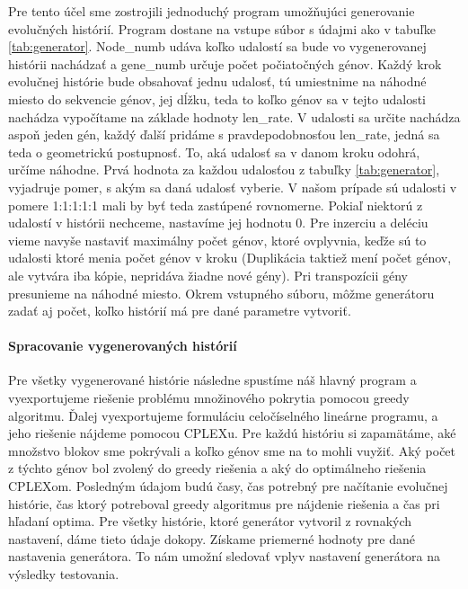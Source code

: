Pre tento účel sme zostrojili jednoduchý program umožňujúci generovanie evolučných histórií.
Program dostane na vstupe súbor s údajmi ako v tabuľke \ref{tab:generator}.
Node\_numb udáva koľko udalostí sa bude vo vygenerovanej histórii nachádzať
a gene\_numb určuje počet počiatočných génov. Každý krok evolučnej histórie bude obsahovať jednu udalosť, 
tú umiestnime na náhodné miesto do sekvencie génov,
jej dĺžku, teda to koľko génov sa v tejto udalosti nachádza vypočítame na základe hodnoty len\_rate.
V udalosti sa určite nachádza aspoň jeden gén, každý ďalší pridáme s pravdepodobnosťou len\_rate, jedná sa teda o geometrickú postupnosť.
To, aká udalosť sa v danom kroku odohrá, určíme náhodne. Prvá hodnota za každou udalosťou z tabuľky \ref{tab:generator}, 
vyjadruje pomer, s akým sa daná udalosť vyberie. V našom prípade sú udalosti v pomere 1:1:1:1:1 mali by byť teda zastúpené rovnomerne.
Pokiaľ niektorú z udalostí v histórii nechceme, nastavíme jej hodnotu 0. Pre inzerciu a deléciu vieme navyše nastaviť maximálny počet génov,
ktoré ovplyvnia, 
keďže sú to udalosti ktoré menia počet génov v kroku (Duplikácia taktiež mení počet génov, ale vytvára iba kópie, nepridáva žiadne nové gény).
Pri transpozícii gény presunieme na náhodné miesto.
Okrem vstupného súboru, môžme generátoru zadať aj počet, koľko histórií má pre dané parametre vytvoriť.
\paragraph{Spracovanie vygenerovaných histórií}
Pre všetky vygenerované histórie následne spustíme náš hlavný program a vyexportujeme riešenie problému množinového pokrytia 
pomocou greedy algoritmu.
Ďalej vyexportujeme formuláciu celočíselného lineárne programu, a jeho riešenie nájdeme pomocou CPLEXu.
Pre každú históriu si zapamätáme, aké množstvo blokov sme pokrývali a koľko génov sme na to mohli vuyžiť.
Aký počet z týchto génov bol zvolený do greedy riešenia a aký do optimálneho riešenia CPLEXom.
Posledným údajom budú časy, čas potrebný pre načítanie evolučnej histórie, čas ktorý potreboval greedy algoritmus pre nájdenie riešenia a čas pri hľadaní optima.
Pre všetky histórie, ktoré generátor vytvoril z rovnakých nastavení, dáme tieto údaje dokopy. Získame priemerné hodnoty pre dané nastavenia generátora. 
To nám umožní sledovať vplyv nastavení generátora na výsledky testovania.

